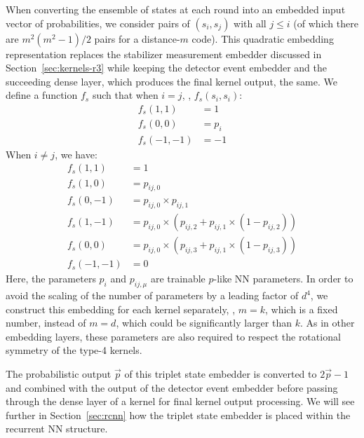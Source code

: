 When converting the ensemble of states at each round into an embedded input vector of probabilities, we consider pairs of $(s_i, s_j)$ with all $j\leq i$ (of which there are $m^2\left(m^2-1\right)/2$ pairs for a distance-$m$ code). 
This quadratic embedding representation replaces the stabilizer measurement embedder discussed in Section~\ref{sec:kernels-r3} while keeping the detector event embedder and the succeeding dense layer, which produces the final kernel output, the same.
We define a function $f_s$ such that when $i=j$, \ie, $f_s(s_i, s_i)$:
\begin{align*}
f_s(1,1) &= 1 \\
f_s(0,0) &= p_i \\
f_s(-1,-1) &= -1
\end{align*}
When $i \neq j$, we have:
\begin{align*}
f_s(1,1) &= 1 \\
f_s(1,0) &= p_{ij,0} \\
f_s(0,-1) &= p_{ij,0} \times p_{ij,1} \\
f_s(1,-1) &= p_{ij,0} \times \left(p_{ij,2} + p_{ij,1} \times \left(1-p_{ij,2}\right)\right) \\
f_s(0,0) &= p_{ij,0} \times \left(p_{ij,3} + p_{ij,1} \times \left(1-p_{ij,3}\right)\right) \\
f_s(-1,-1) &= 0
\end{align*}
Here, the parameters $p_i$ and $p_{ij,\mu}$ are trainable $p$-like NN parameters. In order to avoid the scaling of the number of parameters by a leading factor of $d^4$, we construct this embedding for each kernel separately, \ie, $m=k$, which is a fixed number, instead of $m=d$, which could be significantly larger than $k$. As in other embedding layers, these parameters are also required to respect the rotational symmetry of the type-4 kernels.

The probabilistic output $\vec{p}$ of this triplet state embedder is converted to $2\vec{p}-1$ and combined with the output of the detector event embedder before passing through the dense layer of a kernel for final kernel output processing. We will see further in Section~\ref{sec:rcnn} how the triplet state embedder is placed within the recurrent NN structure.
